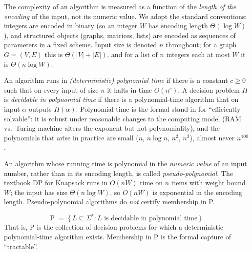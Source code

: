 \begin{definition}
\label{def:encoding}
The complexity of an algorithm is measured as a function of the \emph{length of the encoding} of the input, not its numeric value. We adopt the standard conventions: integers are encoded in binary (so an integer $W$ has encoding length $\Theta(\log W)$), and structured objects (graphs, matrices, lists) are encoded as sequences of parameters in a fixed scheme. Input size is denoted $n$ throughout; for a graph $G = (V, E)$ this is $\Theta(|V| + |E|)$, and for a list of $n$ integers each at most $W$ it is $\Theta(n \log W)$.
\end{definition}

\begin{definition}
\label{def:dtime_poly}
An algorithm runs in \emph{(deterministic) polynomial time} if there is a constant $c \ge 0$ such that on every input of size $n$ it halts in time $O(n^c)$. A decision problem $\Pi$ is \emph{decidable in polynomial time} if there is a polynomial-time algorithm that on input $\alpha$ outputs $\Pi(\alpha)$. Polynomial time is the formal stand-in for ``efficiently solvable'': it is robust under reasonable changes to the computing model (RAM vs.\ Turing machine alters the exponent but not polynomiality), and the polynomials that arise in practice are small ($n$, $n \log n$, $n^2$, $n^3$), almost never $n^{100}$.
\end{definition}

\begin{remark}
An algorithm whose running time is polynomial in the \emph{numeric value} of an input number, rather than in its encoding length, is called \emph{pseudo-polynomial}. The textbook DP for Knapsack runs in $O(nW)$ time on $n$ items with weight bound $W$; the input has size $\Theta(n \log W)$, so $O(nW)$ is exponential in the encoding length. Pseudo-polynomial algorithms do \emph{not} certify membership in P.
\end{remark}

\begin{definition}[Class P]
\label{def:class_p}
\[
  \mathrm{P} \;=\; \{\, L \subseteq \Sigma^* : L \text{ is decidable in polynomial time}\,\}.
\]
That is, $\mathrm{P}$ is the collection of decision problems for which a deterministic polynomial-time algorithm exists. Membership in $\mathrm{P}$ is the formal capture of ``tractable''.
\end{definition}


